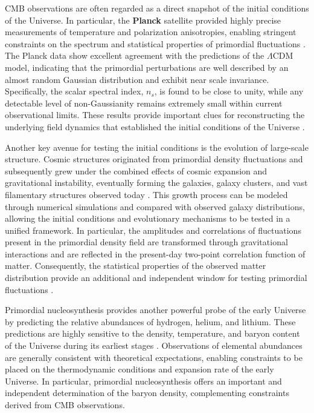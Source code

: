 CMB observations are often regarded as a direct snapshot of the initial conditions of the Universe. In particular, the \textbf{Planck} satellite provided highly precise measurements of temperature and polarization anisotropies, enabling stringent constraints on the spectrum and statistical properties of primordial fluctuations \cite{planck2020}. The Planck data show excellent agreement with the predictions of the $\Lambda$CDM model, indicating that the primordial perturbations are well described by an almost random Gaussian distribution and exhibit near scale invariance. Specifically, the scalar spectral index, $n_s$, is found to be close to unity, while any detectable level of non-Gaussianity remains extremely small within current observational limits. These results provide important clues for reconstructing the underlying field dynamics that established the initial conditions of the Universe \cite{planck2020}.

Another key avenue for testing the initial conditions is the evolution of large-scale structure. Cosmic structures originated from primordial density fluctuations and subsequently grew under the combined effects of cosmic expansion and gravitational instability, eventually forming the galaxies, galaxy clusters, and vast filamentary structures observed today \cite{peebles1980}. This growth process can be modeled through numerical simulations and compared with observed galaxy distributions, allowing the initial conditions and evolutionary mechanisms to be tested in a unified framework. In particular, the amplitudes and correlations of fluctuations present in the primordial density field are transformed through gravitational interactions and are reflected in the present-day two-point correlation function of matter. Consequently, the statistical properties of the observed matter distribution provide an additional and independent window for testing primordial fluctuations \cite{springel2005,dodelson2003}.

Primordial nucleosynthesis provides another powerful probe of the early Universe by predicting the relative abundances of hydrogen, helium, and lithium. These predictions are highly sensitive to the density, temperature, and baryon content of the Universe during its earliest stages \cite{schramm1998}. Observations of elemental abundances are generally consistent with theoretical expectations, enabling constraints to be placed on the thermodynamic conditions and expansion rate of the early Universe. In particular, primordial nucleosynthesis offers an important and independent determination of the baryon density, complementing constraints derived from CMB observations.

